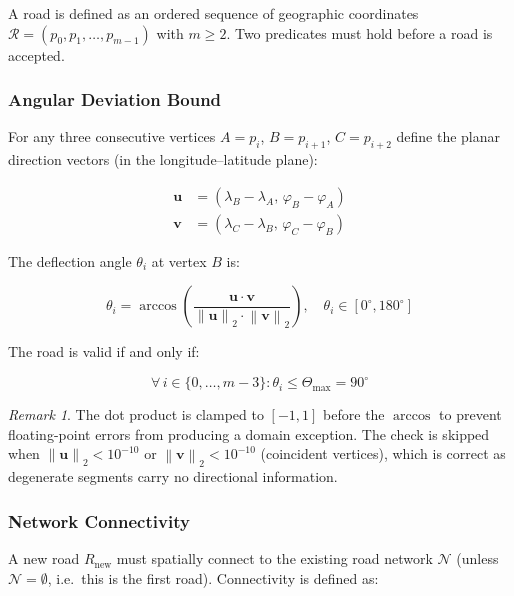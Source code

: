 \documentclass[12pt,a4paper]{article}
\theoremstyle{definition}
\theoremstyle{plain}
\theoremstyle{remark}
\newtheorem{remark}{Remark}[section]
\newcommand{\norm}[1]{\left\lVert #1 \right\rVert}
\newcommand{\vect}[1]{\mathbf{#1}}
\newcommand{\coord}[2]{(#1,\,#2)}
\begin{document}
A road is defined as an ordered sequence of geographic coordinates
$\mathcal{R} = (p_0, p_1, \ldots, p_{m-1})$ with $m \geq 2$.
Two predicates must hold before a road is accepted.

\subsubsection{Angular Deviation Bound}

For any three consecutive vertices $A = p_i$, $B = p_{i+1}$, $C = p_{i+2}$
define the planar direction vectors (in the longitude--latitude plane):

\begin{align}
  \vect{u} &= \coord{\lambda_B - \lambda_A}{\varphi_B - \varphi_A} \\
  \vect{v} &= \coord{\lambda_C - \lambda_B}{\varphi_C - \varphi_B}
\end{align}

The deflection angle $\theta_i$ at vertex $B$ is:

\begin{equation}
  \theta_i = \arccos\!\left(
    \frac{\vect{u} \cdot \vect{v}}{\norm{\vect{u}}_2 \cdot \norm{\vect{v}}_2}
  \right), \quad
  \theta_i \in [0^\circ, 180^\circ]
  \label{eq:road_angle}
\end{equation}

The road is valid if and only if:

\begin{equation}
  \forall\, i \in \{0, \ldots, m-3\}:
  \theta_i \leq \Theta_{\max} = 90^\circ
  \label{eq:road_angle_predicate}
\end{equation}

\begin{remark}
The dot product is clamped to $[-1, 1]$ before the $\arccos$ to prevent
floating-point errors from producing a domain exception. The check is
skipped when $\norm{\vect{u}}_2 < 10^{-10}$ or $\norm{\vect{v}}_2 < 10^{-10}$
(coincident vertices), which is correct as degenerate segments carry no
directional information.
\end{remark}

\subsubsection{Network Connectivity}

A new road $R_{\text{new}}$ must spatially connect to the existing road
network $\mathcal{N}$ (unless $\mathcal{N} = \emptyset$, i.e.\ this is the
first road). Connectivity is defined as:
\end{document}
